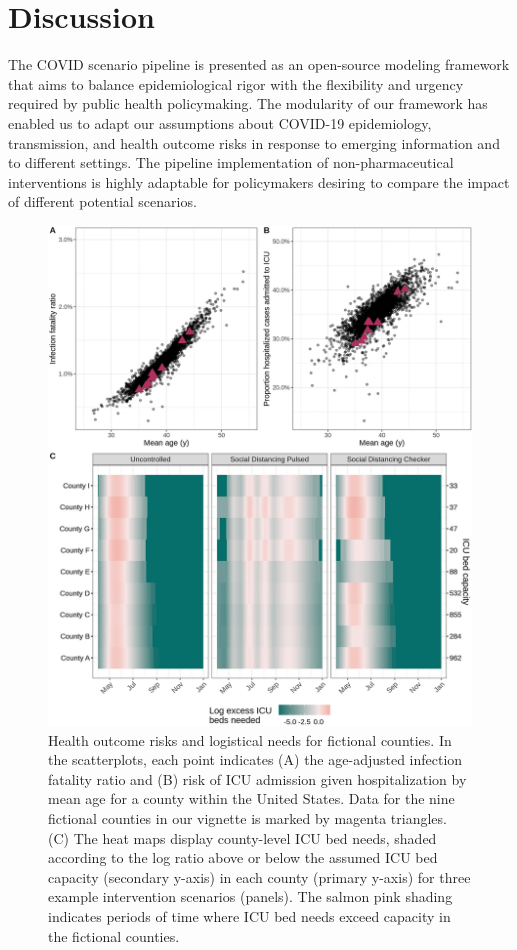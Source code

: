 {\section{Discussion}
The COVID scenario pipeline is presented as an open-source modeling framework that aims to balance epidemiological rigor with the flexibility and urgency required by public health policymaking. The modularity of our framework has enabled us to adapt our assumptions about COVID-19 epidemiology, transmission, and health outcome risks in response to emerging information and to different settings. The pipeline implementation of non-pharmaceutical interventions is highly adaptable for policymakers desiring to compare the impact of different potential scenarios.

\begin{figure}[!htb]%
    \centering
    \includegraphics{fig_pipeline/fig3a}
    \caption[Health outcome risks and logistical needs for fictional counties.]{Health outcome risks and logistical needs for fictional counties. In the scatterplots, each point indicates (A) the age-adjusted infection fatality ratio and (B) risk of ICU admission given hospitalization by mean age for a county within the United States. Data for the nine fictional counties in our vignette is marked by magenta triangles. (C) The heat maps display county-level ICU bed needs, shaded according to the log ratio above or below the assumed ICU bed capacity (secondary y-axis) in each county (primary y-axis) for three example intervention scenarios (panels). The salmon pink shading indicates periods of time where ICU bed needs exceed capacity in the fictional counties.}
    \label{fig:pipeline-outcome}
\end{figure}

}
